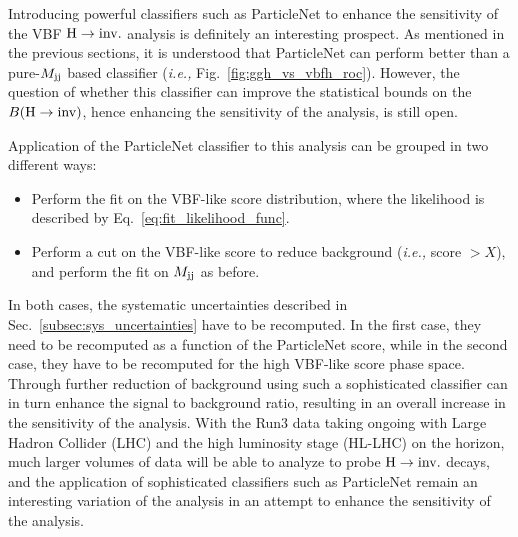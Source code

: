 Introducing powerful classifiers such as ParticleNet to enhance the sensitivity of the VBF $\textrm{H} \rightarrow \textrm{inv.}$ analysis
is definitely an interesting prospect. As mentioned in the previous sections, it is understood that ParticleNet can perform
better than a pure-$M_{\textrm{jj}}$ based classifier (\textit{i.e.,} Fig.~\ref{fig:ggh_vs_vbfh_roc}). However, the question of whether this
classifier can improve the statistical bounds on the ${B(\textrm{H}\rightarrow\text{inv})}$, hence enhancing the sensitivity of the analysis, is still open.

Application of the ParticleNet classifier to this analysis can be grouped in two different ways:

\begin{itemize}
    \item Perform the fit on the VBF-like score distribution, where the likelihood is described by Eq.~\ref{eq:fit_likelihood_func}.
    \item Perform a cut on the VBF-like score to reduce background (\textit{i.e.,} score $> X$), and perform the fit on $M_{\textrm{jj}}$ as before.
\end{itemize}

In both cases, the systematic uncertainties described in Sec.~\ref{subsec:sys_uncertainties} have to be recomputed. In the first case,
they need to be recomputed as a function of the ParticleNet score, while in the second case, they have to be recomputed for the high
VBF-like score phase space. Through further reduction of background using such a sophisticated classifier can in turn enhance the signal
to background ratio, resulting in an overall increase in the sensitivity of the analysis. With the Run3 data taking ongoing with Large
Hadron Collider (LHC) and the high luminosity stage (HL-LHC) on the horizon, much larger volumes of data will be able to analyze to probe
$\textrm{H} \rightarrow \textrm{inv.}$ decays, and the application of sophisticated classifiers such as ParticleNet remain an interesting variation of the analysis in
an attempt to enhance the sensitivity of the analysis.